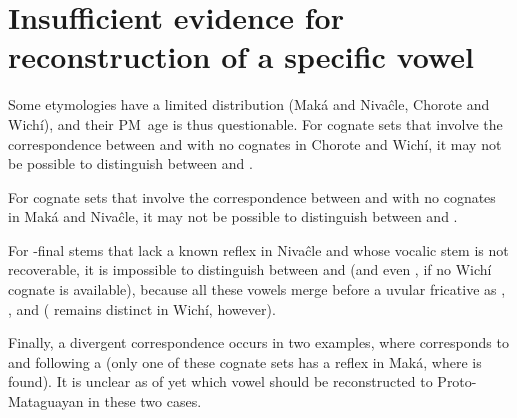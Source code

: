 \begin{exe}
    \ex \spitcw
    \ex \hunger
    \ex \runv
    \ex \chaguark
    \ex \pacu
    \ex \skycloud
    \ex \drum
    \ex \yellowv
    \ex \dovesipup
    \ex \smoke
    \ex \burnvi
    \ex \suckcw
    \ex \burnvt
    \ex \wut
    \ex \clothes
    \ex \temperance
    \ex \caracara
    \ex \eel
\end{exe}

\section{Insufficient evidence for reconstruction of a specific vowel}\label{vowels-insufficient}
\largerpage
Some etymologies have a limited distribution (Maká and Nivaĉle, Chorote and Wichí), and their PM~age is thus questionable.
For cognate sets that involve the correspondence between  and  with no cognates in Chorote and Wichí, it may not be possible to distinguish between  and .

\begin{exe}
    \ex \burnalh
    \ex \foodmn
    \ex \locustmn
    \ex \ameiva
    \ex \obey
    \ex \smooth
    \ex \agile
    \ex \hookmn
    \ex \dwarf
    \ex \leafmn
    \ex \utensil
    \ex \vertical
    \ex \tsaqaq
    \ex \tireddie
    \ex \ashamedmn
    \ex \mollef
    \ex \queenpalmf
\end{exe}

For cognate sets that involve the correspondence between  and  with no cognates in Maká and Nivaĉle, it may not be possible to distinguish between  and .

\begin{exe}
    \ex \inhabitant
    \ex \whitealgarrobof
    \ex \frighten
    \ex \cook
    \ex \orphancw
    \ex \bilecw
    \ex \precipice
    \ex \temperance
    \ex \cebil
    \ex \aloja
    \ex \ashamedcw
\end{exe}

For \mbox{-}final stems that lack a known reflex in Nivaĉle and whose vocalic stem is not recoverable, it is impossible to distinguish between  and  (and even , if no Wichí cognate is available), because all these vowels merge before a uvular fricative as , , and  ( remains distinct in Wichí, however).

\begin{exe}
    \ex \dividev
    \ex \chaguark
    \ex \sandisaj
\end{exe}

Finally, a divergent correspondence occurs in two examples, where  corresponds to  and  following a  (only one of these cognate sets has a reflex in Maká, where  is found). It is unclear as of yet which vowel should be reconstructed to Proto-Mataguayan in these two cases.

\begin{exe}
    \ex \largefat
    \ex \climb
\end{exe}
